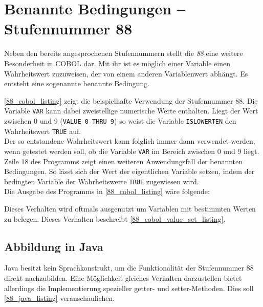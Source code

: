 \section{Benannte Bedingungen -- Stufennummer 88}
Neben den bereits angesprochenen Stufennummern stellt die \textit{88} eine weitere Besonderheit in COBOL dar. Mit ihr ist es möglich einer Variable einen Wahrheitswert zuzuweisen, der von einem anderen Variablenwert abhängt. Es entsteht eine sogenannte benannte Bedingung.\\


\autoref{88_cobol_listing} zeigt die beispielhafte Verwendung der Stufennummer 88. Die Variable \texttt{VAR} kann dabei zweistellige numerische Werte enthalten. Liegt der Wert zwischen 0 und 9 (\texttt{VALUE 0 THRU 9}) so weist die Variable \texttt{ISLOWERTEN} den Wahrheitswert \texttt{TRUE} auf.\\

Der so entstandene Wahrheitswert kann folglich immer dann verwendet werden, wenn getestet werden soll, ob die Variable \texttt{VAR} im Bereich zwischen 0 und 9 liegt.\\

Zeile 18 des Programms zeigt einen weiteren Anwendungsfall der benannten Bedingungen. So lässt sich der Wert der eigentlichen Variable setzen, indem der bedingten Variable der Wahrheitswerte \texttt{TRUE} zugewiesen wird.\\

Die Ausgabe des Programms in \autoref{88_cobol_listing} wäre folgende:

Dieses Verhalten wird oftmals ausgenutzt um Variablen mit bestimmten Werten zu belegen. Dieses Verhalten beschreibt \autoref{88_cobol_value_set_listing}.\\


\subsection*{Abbildung in Java}
Java besitzt kein Sprachkonstrukt, um die Funktionalität der Stufennummer 88 direkt nachzubilden. Eine Möglichkeit gleiches Verhalten darzustellen bietet allerdings die Implementierung spezieller getter- und setter-Methoden. Dies soll \autoref{88_java_listing} veranschaulichen.\\


